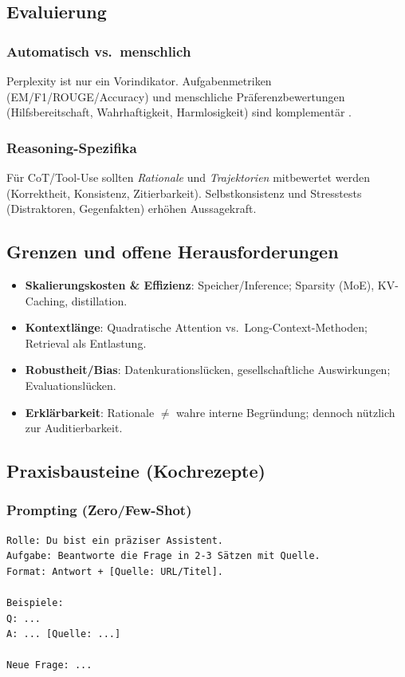 \subsection{Evaluierung}
\subsubsection{Automatisch vs.\ menschlich}
Perplexity ist nur ein Vorindikator. Aufgabenmetriken (EM/F1/ROUGE/Accuracy) und menschliche Präferenzbewertungen (Hilfsbereitschaft, Wahrhaftigkeit, Harmlosigkeit) sind komplementär \cite{ouyang2022training}. 

\subsubsection{Reasoning-Spezifika}
Für CoT/Tool-Use sollten \emph{Rationale} und \emph{Trajektorien} mitbewertet werden (Korrektheit, Konsistenz, Zitierbarkeit). Selbstkonsistenz und Stresstests (Distraktoren, Gegenfakten) erhöhen Aussagekraft.

\subsection{Grenzen und offene Herausforderungen}
\begin{itemize}
  \item \textbf{Skalierungskosten \& Effizienz}: Speicher/Inference; Sparsity (MoE), KV-Caching, distillation.
  \item \textbf{Kontextlänge}: Quadratische Attention vs.\ Long-Context-Methoden; Retrieval als Entlastung.
  \item \textbf{Robustheit/Bias}: Datenkurationslücken, gesellschaftliche Auswirkungen; Evaluationslücken.
  \item \textbf{Erklärbarkeit}: Rationale $\neq$ wahre interne Begründung; dennoch nützlich zur Auditierbarkeit.
\end{itemize}

\subsection{Praxisbausteine (Kochrezepte)}
\subsubsection*{Prompting (Zero/Few-Shot)}
\begin{verbatim}
Rolle: Du bist ein präziser Assistent.
Aufgabe: Beantworte die Frage in 2-3 Sätzen mit Quelle.
Format: Antwort + [Quelle: URL/Titel].

Beispiele:
Q: ...
A: ... [Quelle: ...]

Neue Frage: ...
\end{verbatim}

